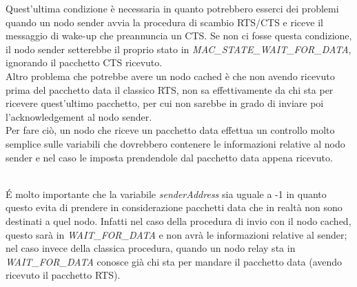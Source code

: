 Quest'ultima condizione è necessaria in quanto potrebbero esserci dei problemi quando un nodo sender avvia la procedura di scambio RTS/CTS e riceve il messaggio di wake-up che preannuncia un CTS. Se non ci fosse questa condizione, il nodo sender setterebbe il proprio stato in \textit{MAC\_STATE\_WAIT\_FOR\_DATA}, ignorando il pacchetto CTS ricevuto. \\

Altro problema che potrebbe avere un nodo cached è che non avendo ricevuto prima del pacchetto data il classico RTS, non sa effettivamente da chi sta per ricevere quest'ultimo pacchetto, per cui non sarebbe in grado di inviare poi l'acknowledgement al nodo sender.\\
Per fare ciò, un nodo che riceve un pacchetto data effettua un controllo molto semplice sulle variabili che dovrebbero contenere le informazioni relative al nodo sender e nel caso le imposta prendendole dal pacchetto data appena ricevuto.

 \\

\'E molto importante che la variabile \textit{senderAddress} sia uguale a -1 in quanto questo evita di prendere in considerazione pacchetti data che in realtà non sono destinati a quel nodo. Infatti nel caso della procedura di invio con il nodo cached, questo sarà in \textit{WAIT\_FOR\_DATA} e non avrà le informazioni relative al sender; nel caso invece della classica procedura, quando un nodo relay sta in \textit{WAIT\_FOR\_DATA} conosce già chi sta per mandare il pacchetto data (avendo ricevuto il pacchetto RTS).